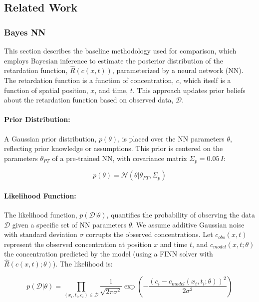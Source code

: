 \documentclass{article}
\begin{document}
\subsection{Related Work}
\subsubsection{Bayes NN}
\label{sec:bayes_nn}
This section describes the baseline methodology used for comparison, which employs Bayesian inference to estimate the posterior distribution of the retardation function, $\hat{R}(c(x,t))$, parameterized by a neural network (NN). The retardation function is a function of concentration, $c$, which itself is a function of spatial position, $x$, and time, $t$. This approach updates prior beliefs about the retardation function based on observed data, $\mathcal{D}$.

\paragraph{Prior Distribution:}

A Gaussian prior distribution, $p(\theta)$, is placed over the NN parameters $\theta$, reflecting prior knowledge or assumptions. This prior is centered on the parameters $\theta_{PT}$ of a pre-trained NN, with covariance matrix $\Sigma_p = 0.05 \, I$:


\begin{equation*}
p(\theta) = \mathcal{N}(\theta | \theta_{PT}, \Sigma_p)
\end{equation*}

\paragraph{Likelihood Function:}

The likelihood function, $p(\mathcal{D} | \theta)$, quantifies the probability of observing the data $\mathcal{D}$ given a specific set of NN parameters $\theta$. We assume additive Gaussian noise with standard deviation $\sigma$ corrupts the observed concentrations. Let $c_{obs}(x,t)$ represent the observed concentration at position $x$ and time $t$, and $c_{model}(x,t; \theta)$ the concentration predicted by the model (using a FINN solver with $\hat{R}(c(x,t);\theta)$). The likelihood is:

\begin{equation}
p(\mathcal{D} | \theta) = \prod_{(x_i, t_i, c_i) \in \mathcal{D}} \frac{1}{\sqrt{2\pi \sigma^2}} \exp \left( -\frac{(c_i - c_{model}(x_i, t_i; \theta))^2}{2\sigma^2} \right)
\label{eq:likelihood}
\end{equation}
\end{document}
